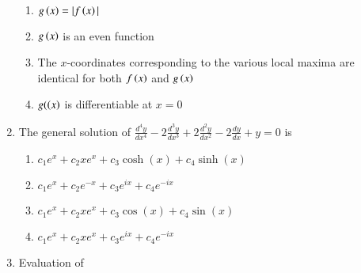 \documentclass[journal]{IEEEtran}
\begin{document}
\begin{enumerate}
{        	\begin{enumerate}
        		\item \(g\left(x\right) = |f\left(x\right)|\)
        		\item \(g\left(x\right)\) is an even function
        		\item The \(x\)-coordinates corresponding to the various local maxima are identical for both \(f\left(x\right)\) and \(g\left(x\right)\)
        		\item \(g(\left(x\right)\) is differentiable at \(x = 0\)
        	\end{enumerate}
  		}
    
    \item {
    	The general solution of $
    	\frac{d^4y}{dx^4} - 2\frac{d^3y}{dx^3} + 2\frac{d^2y}{dx^2} - 2\frac{dy}{dx} + y = 0
    	$
    	is
    	\begin{multicols}{2}
	    	\begin{enumerate}
	    		\item \( c_1 e^x + c_2 xe^x + c_3 \cosh(x) + c_4 \sinh(x) \)
	    		\item \( c_1 e^x + c_2 e^{-x} + c_3 e^{ix} + c_4 e^{-ix} \)
	    		\item \( c_1 e^x + c_2 xe^x + c_3 \cos(x) + c_4 \sin(x) \)
	    		\item \( c_1 e^x + c_2 xe^x + c_3 e^{ix} + c_4 e^{-ix} \)
	    	\end{enumerate}
    	\end{multicols}
    
    }    
    \item {Evaluation of
    	
}
\end{enumerate}
\end{document}
